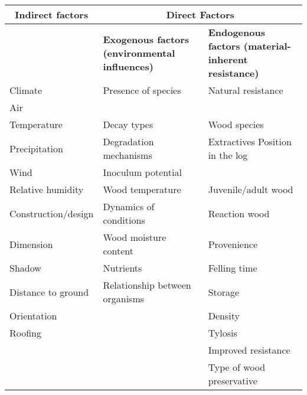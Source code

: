 \begin{table}[ht!]
\centering
\renewcommand{\arraystretch}{1.3} %
\small %
\begin{tabularx}{\textwidth}{|X|X|X|}
\hline
\multicolumn{1}{|c|}{\textbf{Indirect factors}} & \multicolumn{2}{c|}{\textbf{Direct Factors}} \\ \hline
 & \textbf{Exogenous factors (environmental influences)} & \textbf{Endogenous factors (material-inherent resistance)} \\ \hline
Climate & Presence of species & Natural resistance \\
\hspace{5mm}Air & &\\
\hspace{5mm}Temperature & Decay types & \hspace{5mm}Wood species \\
\hspace{5mm}Precipitation & \hspace{5mm}Degradation mechanisms & \hspace{5mm}Extractives Position in the log \\
\hspace{5mm}Wind & Inoculum potential &  \\
\hspace{5mm}Relative humidity & Wood temperature & \hspace{5mm}Juvenile/adult wood \\
Construction/design & \hspace{5mm}Dynamics of conditions & \hspace{5mm}Reaction wood \\
Dimension & Wood moisture content & \hspace{5mm}Provenience \\
Shadow & \hspace{5mm}Nutrients & \hspace{5mm}Felling time \\
Distance to ground & Relationship between organisms & Storage \\
Orientation &  & \hspace{5mm}Density \\
Roofing &  & \hspace{5mm}Tylosis \\
 &  & Improved resistance \\
 &  & \hspace{5mm}Type of wood preservative \\

\end{tabularx}
\end{table}
